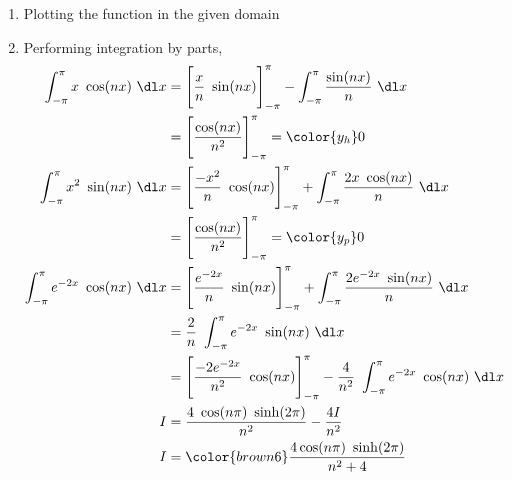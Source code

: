 \begin{enumerate}
    \item Plotting the function in the given domain
          \begin{figure}[H]
              \centering
          \end{figure}

    \item Performing integration by parts,
          \begin{align}
              \int_{-\pi}^{\pi} x\ \cos(nx)\ \dl x
                & = \Bigg[\frac{x}{n}\ \sin(nx)\Bigg]_{-\pi}^{\pi}
              - \int_{-\pi}^{\pi} \frac{\sin(nx)}{n}\ \dl x                         \\
                & = \Bigg[ \frac{\cos(nx)}{n^2} \Bigg]_{-\pi}^{\pi} = \color{y_h} 0 \\
              \int_{-\pi}^{\pi} x^2\ \sin(nx)\ \dl x
                & = \Bigg[\frac{-x^2}{n}\ \cos(nx)\Bigg]_{-\pi}^{\pi}
              + \int_{-\pi}^{\pi} \frac{2x\ \cos(nx)}{n}\ \dl x                     \\
                & = \Bigg[ \frac{\cos(nx)}{n^2} \Bigg]_{-\pi}^{\pi} = \color{y_p} 0 \\
              \int_{-\pi}^{\pi} e^{-2x}\ \cos(nx)\ \dl x
                & = \Bigg[\frac{e^{-2x}}{n}\ \sin(nx)\Bigg]_{-\pi}^{\pi}
              + \int_{-\pi}^{\pi} \frac{2e^{-2x}\ \sin(nx)}{n}\ \dl x               \\
                & = \frac{2}{n}\ \int_{-\pi}^{\pi} e^{-2x}\ \sin(nx)\ \dl x         \\
                & = \Bigg[ \frac{-2e^{-2x}}{n^2}\ \cos(nx) \Bigg]_{-\pi}^{\pi}
              - \frac{4}{n^2}\ \int_{-\pi}^{\pi} e^{-2x}\ \cos(nx)\ \dl x           \\
              I & = \frac{4\ \cos(n\pi)\ \sinh(2\pi)}{n^2} - \frac{4I}{n^2}         \\
              I & = \color{brown6}\frac{4\cos(n\pi)\ \sinh(2\pi)}{n^2 + 4}
          \end{align}


\end{enumerate}
